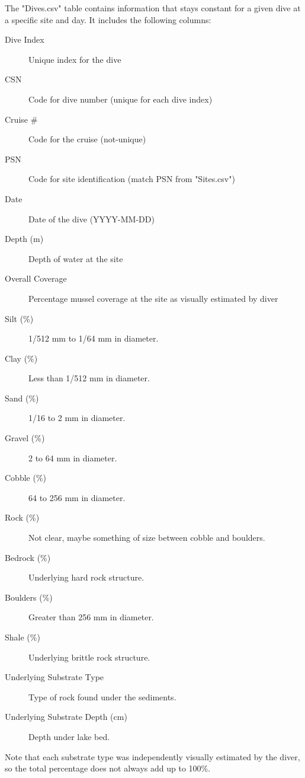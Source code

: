 \documentclass[11pt]{article} %
\begin{document}
The "Dives.csv" table contains information that stays constant for a given dive at a specific site and day. It includes the following columns:
\begin{description}
\item[Dive Index] Unique index for the dive
\item[CSN] Code for dive number (unique for each dive index)
\item[Cruise \#] Code for the cruise (not-unique)
\item[PSN] Code for site identification (match PSN from "Sites.csv")
\item[Date] Date of the dive (YYYY-MM-DD)
\item[Depth (m)] Depth of water at the site
\item[Overall Coverage] Percentage mussel coverage at the site as visually estimated by diver
\item[Silt (\%)]	1/512 mm to 1/64 mm in diameter.
\item[Clay (\%)	] Less than 1/512 mm in diameter.
\item[Sand (\%)] 1/16 to 2 mm in diameter.
\item[Gravel (\%)] 2 to 64 mm in diameter.
\item[Cobble (\%)] 64 to 256 mm in diameter.
\item[Rock (\%)] Not clear, maybe something of size between cobble and boulders.
\item[Bedrock (\%)] Underlying hard rock structure.
\item[Boulders (\%)] Greater than 256 mm in diameter.
\item[Shale (\%)] Underlying brittle rock structure.
\item[Underlying Substrate Type] Type of rock found under the sediments.
\item[Underlying Substrate Depth (cm)] Depth under lake bed.
\end{description}
Note that each substrate type was independently visually estimated by the diver, so the total percentage does not always add up to 100\%.
\end{document}
